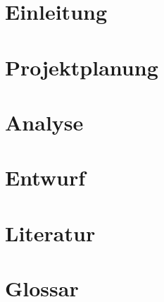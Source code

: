 \documentclass[11pt]{article}
\begin{document}

    
    \newpage
    \tableofcontents
    \newpage
    \section{Einleitung}
    
    \pagebreak
    \section{Projektplanung}
    
    \pagebreak
    \section{Analyse}
    
    \pagebreak
    \section{Entwurf}
    

    \clearpage
    \pagestyle{plain} %
    \section{Literatur}
    
    \pagebreak
    \section{Glossar}
    
    \pagebreak
    
\end{document}
